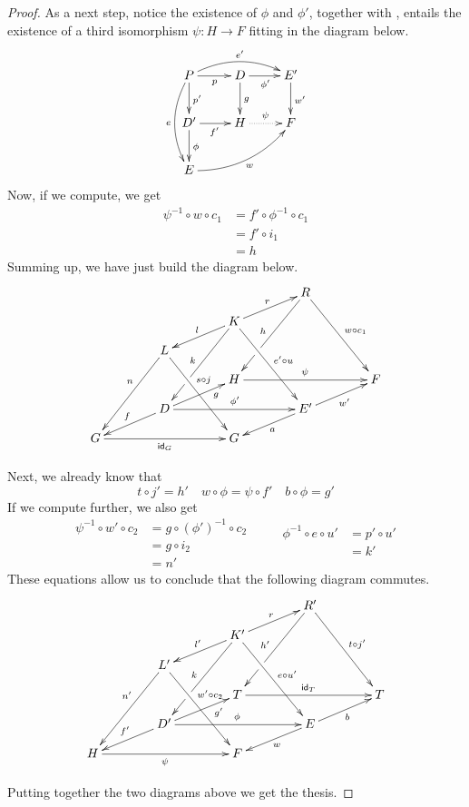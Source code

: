 \begin{proof}
	As a next step, notice the existence of $\phi$ and $\phi'$, together with , entails  the existence of a third isomorphism $\psi\colon H\to F$ fitting in the diagram below.
	\[\xymatrix{P  \ar[d]^{p'}\ar@/_.4cm/[dd]_{e}\ar@/^.4cm/[rr]^{e'} \ar[r]_{p} & D \ar[d]^{g} \ar[r]_{\phi'} & E'\ar[d]^{w'}\\D' \ar[d]^{\phi} \ar[r]_{f'} & H\ar@{.>}[r]^{\psi} & F \\E \ar@/_.4cm/[urr]_{w}}\]
Now, if we compute, we get
\begin{align*}
	\psi^{-1}\circ w\circ c_1&=f'\circ \phi^{-1}\circ c_1\\&=f'\circ i_1\\&=h
\end{align*}
	Summing up, we have just build the diagram below.	
	\[\xymatrix@C=40pt@R=10pt{ &&&R\ar[dddr]^{w\circ c_1} \ar[dddl]_{h}|(.67)\hole\\&&K \ar[dl]_{l} \ar[ur]^{r}\ar[dddr]^{e'\circ u} \ar[dddl]_{k}|(.67)\hole\\&L\ar[dddr]^(.4){s\circ j} \ar[dddl]_(.4){n}\\&&H \ar[rr]^{\psi} && F\\ & D \ar[ur]_(.7){g} \ar[rr]^{\phi'} \ar[dl]_{f}&& E' \ar[ur]_{w'}\ar[dl]^{a}\\ G \ar[rr]_{\id{G}} && G}\]

Next, we already know that
\[t\circ j'= h' \quad w\circ \phi = \psi \circ f' \quad b\circ \phi = g'\]
If we compute further, we also get
\[\begin{split}
	\psi^{-1}\circ w'\circ c_2 &= g\circ (\phi')^{-1}\circ c_2\\&=g\circ i_2\\&=n'
\end{split}\qquad \begin{split}
\phi^{-1}\circ e \circ u'&=p'\circ u'\\&= k'\\&
\end{split}\]
These equations allow us to conclude that the following diagram commutes.
	\[\xymatrix@C=40pt@R=10pt{ &&&R'\ar[dddr]^{t\circ j'} \ar[dddl]_{h'}|(.67)\hole\\&&K' \ar[dl]_{l'} \ar[ur]^{r}\ar[dddr]^{e\circ u'} \ar[dddl]_{k}|(.67)\hole\\&L'\ar[dddr]^(.4){w'\circ c_2} \ar[dddl]_(.4){n'}\\&&T \ar[rr]^{\id{T}} && T\\ & D' \ar[ur]_(.7){g'} \ar[rr]^{\phi} \ar[dl]_{f'}&& E \ar[ur]_{b}\ar[dl]^{w}\\ H \ar[rr]_{\psi} && F}\]

Putting together the two diagrams above we get the thesis. \qedhere 
\end{proof}


